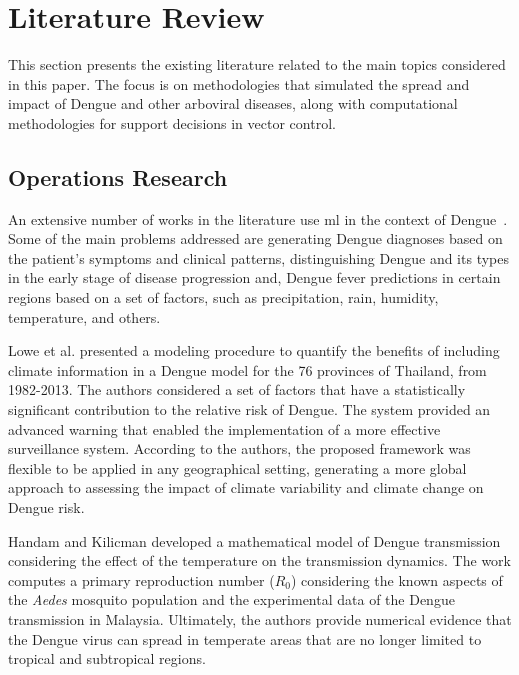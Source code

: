 \chapter{Literature Review}\label{sec:literature-review}

\def\checkmark{\tikz\fill[scale=0.4](0,.35) -- (.25,0) -- (1,.7) -- (.25,.15) --
	cycle;}

This section presents the existing literature related to the main topics
considered in this paper. The focus is on methodologies that simulated the
spread and impact of Dengue and other arboviral diseases, along with
computational methodologies for support decisions in vector control.

\section{Operations Research}\label{sec:operations-research}

An extensive number  of works in the  literature use \gls{ml} in  the context of
Dengue~\citep{shakurat:2015,shakil:2015,hair:2019,sarma:2020,appice:2020}.  Some
of  the main  problems addressed  are generating  Dengue diagnoses  based on
the patient's symptoms and clinical patterns, distinguishing Dengue and its
types in the early stage of disease progression  and, Dengue fever predictions
in certain regions  based on  a  set of  factors, such  as  precipitation, rain,
humidity, temperature, and others.

Lowe et al. \cite{lowe:2015}  presented a  modeling procedure  to quantify  the
benefits  of including  climate  information in  a  Dengue  model  for  the 76
provinces  of Thailand, from  1982-2013. The authors considered  a set of
factors  that have a statistically  significant contribution  to  the relative
risk  of Dengue.  The system provided  an advanced warning  that enabled  the
implementation of a more effective surveillance system. According to  the
authors, the proposed framework was flexible to be applied in any geographical
setting, generating a more global approach to  assessing the impact of  climate
variability and climate  change on Dengue risk.

Handam and Kilicman \cite{hamdan:2021} developed a mathematical model of Dengue
transmission considering the effect of the temperature on the transmission
dynamics. The work computes a primary reproduction number ($R_0$) considering
the known aspects of the \textit{Aedes} mosquito population and the experimental
data of the Dengue transmission in Malaysia. Ultimately, the authors provide
numerical evidence that the Dengue virus can spread in temperate areas that are
no longer limited to tropical and subtropical regions.

